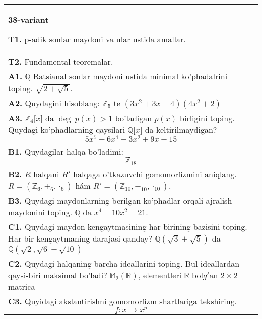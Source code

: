 \documentclass{article}
\begin{document}
\begin{tabular}{m{17cm}}
\textbf{38-variant}
\newline

\textbf{T1.} p-adik sonlar maydoni va ular ustida amallar. \\
\textbf{T2.} Fundamental teoremalar. \\
\textbf{A1.} \(\mathbb{Q}\) Ratsianal sonlar maydoni ustida minimal ko'phadalrini toping.
\(\sqrt{2 + \sqrt{5}}\). \\
\textbf{A2.} Quydagini hisoblang:
\(\mathbb{Z}_{5}\) te \(\left( 3x^{2} + 3x - 4 \right)\left( 4x^{2} + 2 \right)\) \\
\textbf{A3.} \(\mathbb{Z}_{4}\lbrack x\rbrack\) da \(\deg\ p(x) > 1\) bo'ladigan \(p(x)\) birligini toping. Quydagi ko'phadlarning qaysilari \(\mathbb{Q\lbrack}x\rbrack\) da keltirilmaydigan?
\[5x^{5} - 6x^{4} - 3x^{2} + 9x - 15\] \\
\textbf{B1.} Quydagilar halqa bo'ladimi:
\[\mathbb{Z}_{18}\] \\
\textbf{B2.} \(R\) halqani \(R'\) halqaga o'tkazuvchi gomomorfizmini aniqlang.
\(R = (\mathbb{Z}_{6}, +_{6}, \cdot_{6})\) hám \(R' = (\mathbb{Z}_{10}, +_{10}, \cdot_{10})\). \\
\textbf{B3.} Quydagi maydonlarning berilgan ko'phadlar orqali ajralish maydonini toping.
\(\mathbb{Q}\) da \(x^{4} - 10x^{2} + 21\). \\
\textbf{C1.} Quydagi maydon kengaytmasining har birining bazisini toping. Har bir kengaytmaning darajasi qanday?
\(\mathbb{Q}\left( \sqrt{3} + \sqrt{5} \right)\) da \(\mathbb{Q}\left( \sqrt{2},\sqrt{6} + \sqrt{10} \right)\) \\
\textbf{C2.} Quydagi halqaning barcha ideallarini toping. Bul ideallardan qaysi-biri maksimal bo'ladi?
\(\mathbb{M}_{2}\left( \mathbb{R} \right)\), elementleri \(\mathbb{R}\) bol\(g'\)an \(2 \times 2\) matrica \\
\textbf{C3.} Quyidagi akslantirishni gomomorfizm shartlariga tekshiring.
\[f:x \rightarrow x^{p}\] \\

\end{tabular}
\vspace{1cm}
\end{document}
